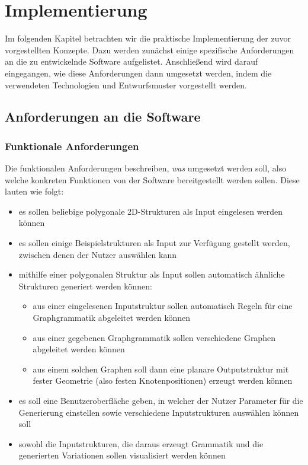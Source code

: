 %
\chapter{Implementierung}
Im folgenden Kapitel betrachten wir die praktische Implementierung der zuvor vorgestellten Konzepte. Dazu werden zunächst
einige spezifische Anforderungen an die zu entwickelnde Software aufgelistet. Anschließend wird darauf eingegangen, wie
diese Anforderungen dann umgesetzt werden, indem die verwendeten Technologien und Entwurfsmuster vorgestellt werden.

\section{Anforderungen an die Software}
\subsection{Funktionale Anforderungen}
Die funktionalen Anforderungen beschreiben, \textit{was} umgesetzt werden soll, also welche konkreten Funktionen von der Software
bereitgestellt werden sollen. Diese lauten wie folgt:

\begin{itemize}
    \item es sollen beliebige polygonale 2D-Strukturen als Input eingelesen werden können
    \item es sollen einige Beispielstrukturen als Input zur Verfügung gestellt werden, zwischen denen der Nutzer auswählen kann
    \item mithilfe einer polygonalen Struktur als Input sollen automatisch ähnliche Strukturen generiert werden können:
    \begin{itemize}
        \item aus einer eingelesenen Inputstruktur sollen automatisch Regeln für eine Graphgrammatik abgeleitet werden können
        \item aus einer gegebenen Graphgrammatik sollen verschiedene Graphen abgeleitet werden können
        \item aus einem solchen Graphen soll dann eine planare Outputstruktur mit fester Geometrie (also festen Knotenpositionen) erzeugt werden können
    \end{itemize}
    \item es soll eine Benutzeroberfläche geben, in welcher der Nutzer Parameter für die Generierung einstellen sowie verschiedene Inputstrukturen auswählen können soll
    \item sowohl die Inputstrukturen, die daraus erzeugt Grammatik und die generierten Variationen sollen visualisiert werden können
\end{itemize}


